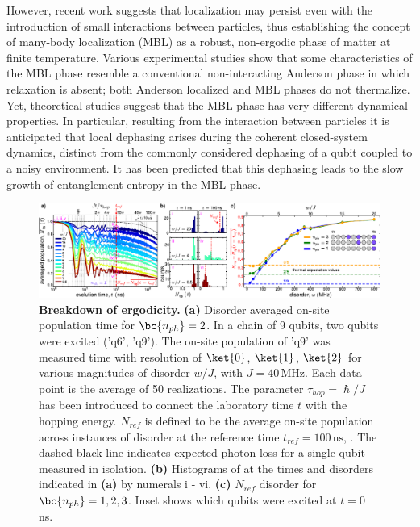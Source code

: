However, recent work suggests that localization may persist even with the introduction of small interactions between particles,
thus establishing the concept of many-body localization (MBL) as a robust, non-ergodic phase of matter at finite temperature.\autocite{Basko2006, Gornyi2005, ImbriePRL2016}
Various experimental studies show that some characteristics of the MBL phase resemble a conventional non-interacting Anderson phase in which relaxation is absent\autocite{BlochMBL2015, demarco2015, Monroe2015, GrossScience2016, Bordia2017, Roushan2018, Lukin2019};
both Anderson localized and MBL phases do not thermalize.
Yet, theoretical studies suggest that the MBL phase has very different dynamical properties.\autocite{Huse2007, Bardarson2012, Huse2014, Serbyn2013, Antonello2017, Serbyn2014, Yasaman2015,  Gopalakrishnan2015, Serbyn2015, ImbriePRL2016}
In particular, resulting from the interaction between particles it is anticipated that local dephasing arises during the coherent closed-system dynamics, distinct from the commonly considered dephasing of a qubit coupled to a noisy environment.
It has been predicted that this dephasing leads to the slow growth of entanglement entropy in the MBL phase.

\afterpage{\FloatBarrier}

\begin{figure}[!t]
    \centering
    \includegraphics[width= 150 mm, keepaspectratio]{./PDF/f2_190731_237p.pdf}
    \caption{\small
    \textbf{Breakdown of ergodicity.}
    \textbf{(a)} Disorder averaged on-site population  time for $\bc{n_{ph}}=2$.
    In a chain of 9 qubits, two qubits were excited ('q6', 'q9').
    The on-site population of 'q9' was measured  time with resolution of $\ket{0}$, $\ket{1}$, $\ket{2}$ for various magnitudes of disorder $w/J$, with $J=40 \, \text{MHz}$.  %
    Each data point is the average of 50 realizations.
    The parameter $\tau_{hop}=\hslash/J$ has been introduced to connect the laboratory time $t$ with the hopping energy.
    $N_{ref}$ is defined to be the average on-site population across instances of disorder at the reference time $t_{ref}=100\,\text{ns}$, .
    The dashed black line indicates expected photon loss for a single qubit measured in isolation.
    \textbf{(b)} Histograms of \bc{$\nqninet$}  at the times and disorders indicated in \textbf{(a)} by numerals i - vi. %
    \textbf{(c)} $N_{ref}$  disorder for $\bc{n_{ph}}=1, 2, 3$.
    Inset shows which qubits were excited at $t=0$ ns.
    }
    \label{fig_2i}
\end{figure}
\afterpage{\FloatBarrier}

